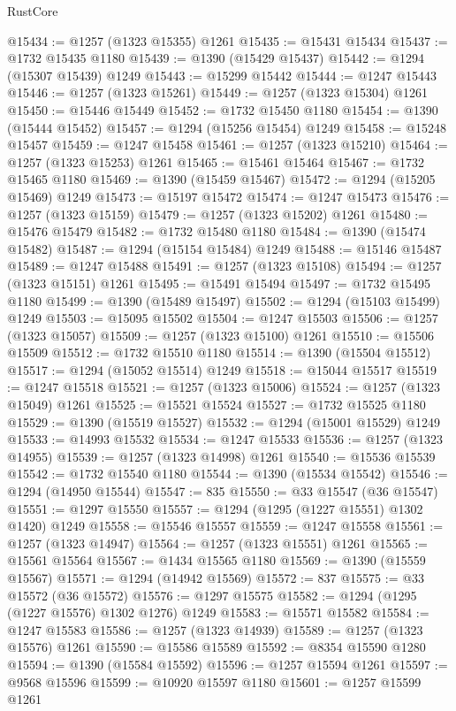 \begin{lexlean}{RustCore}
\begin{coremodule}
@15434 := @1257 (@1323 @15355) @1261
@15435 := @15431 @15434
@15437 := @1732 @15435 @1180
@15439 := @1390 (@15429 @15437)
@15442 := @1294 (@15307 @15439) @1249
@15443 := @15299 @15442
@15444 := @1247 @15443
@15446 := @1257 (@1323 @15261)
@15449 := @1257 (@1323 @15304) @1261
@15450 := @15446 @15449
@15452 := @1732 @15450 @1180
@15454 := @1390 (@15444 @15452)
@15457 := @1294 (@15256 @15454) @1249
@15458 := @15248 @15457
@15459 := @1247 @15458
@15461 := @1257 (@1323 @15210)
@15464 := @1257 (@1323 @15253) @1261
@15465 := @15461 @15464
@15467 := @1732 @15465 @1180
@15469 := @1390 (@15459 @15467)
@15472 := @1294 (@15205 @15469) @1249
@15473 := @15197 @15472
@15474 := @1247 @15473
@15476 := @1257 (@1323 @15159)
@15479 := @1257 (@1323 @15202) @1261
@15480 := @15476 @15479
@15482 := @1732 @15480 @1180
@15484 := @1390 (@15474 @15482)
@15487 := @1294 (@15154 @15484) @1249
@15488 := @15146 @15487
@15489 := @1247 @15488
@15491 := @1257 (@1323 @15108)
@15494 := @1257 (@1323 @15151) @1261
@15495 := @15491 @15494
@15497 := @1732 @15495 @1180
@15499 := @1390 (@15489 @15497)
@15502 := @1294 (@15103 @15499) @1249
@15503 := @15095 @15502
@15504 := @1247 @15503
@15506 := @1257 (@1323 @15057)
@15509 := @1257 (@1323 @15100) @1261
@15510 := @15506 @15509
@15512 := @1732 @15510 @1180
@15514 := @1390 (@15504 @15512)
@15517 := @1294 (@15052 @15514) @1249
@15518 := @15044 @15517
@15519 := @1247 @15518
@15521 := @1257 (@1323 @15006)
@15524 := @1257 (@1323 @15049) @1261
@15525 := @15521 @15524
@15527 := @1732 @15525 @1180
@15529 := @1390 (@15519 @15527)
@15532 := @1294 (@15001 @15529) @1249
@15533 := @14993 @15532
@15534 := @1247 @15533
@15536 := @1257 (@1323 @14955)
@15539 := @1257 (@1323 @14998) @1261
@15540 := @15536 @15539
@15542 := @1732 @15540 @1180
@15544 := @1390 (@15534 @15542)
@15546 := @1294 (@14950 @15544)
@15547 := 835
@15550 := @33 @15547 (@36 @15547)
@15551 := @1297 @15550
@15557 := @1294 (@1295 (@1227 @15551) @1302 @1420) @1249
@15558 := @15546 @15557
@15559 := @1247 @15558
@15561 := @1257 (@1323 @14947)
@15564 := @1257 (@1323 @15551) @1261
@15565 := @15561 @15564
@15567 := @1434 @15565 @1180
@15569 := @1390 (@15559 @15567)
@15571 := @1294 (@14942 @15569)
@15572 := 837
@15575 := @33 @15572 (@36 @15572)
@15576 := @1297 @15575
@15582 := @1294 (@1295 (@1227 @15576) @1302 @1276) @1249
@15583 := @15571 @15582
@15584 := @1247 @15583
@15586 := @1257 (@1323 @14939)
@15589 := @1257 (@1323 @15576) @1261
@15590 := @15586 @15589
@15592 := @8354 @15590 @1280
@15594 := @1390 (@15584 @15592)
@15596 := @1257 @15594 @1261
@15597 := @9568 @15596
@15599 := @10920 @15597 @1180
@15601 := @1257 @15599 @1261

\end{coremodule}
\end{lexlean}
